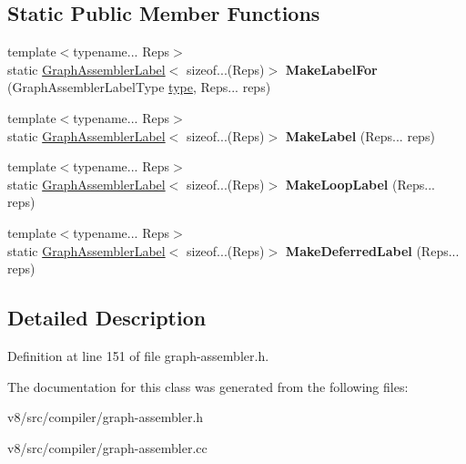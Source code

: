 \subsection*{Static Public Member Functions}
\begin{DoxyCompactItemize}
\item 
\mbox{\label{classv8_1_1internal_1_1compiler_1_1GraphAssembler_ab442635d09c908f12a9c08fe52badd50}} 
{\footnotesize template$<$typename... Reps$>$ }\\static \mbox{\hyperlink{classv8_1_1internal_1_1compiler_1_1GraphAssemblerLabel}{Graph\+Assembler\+Label}}$<$ sizeof...(Reps)$>$ {\bfseries Make\+Label\+For} (Graph\+Assembler\+Label\+Type \mbox{\hyperlink{classstd_1_1conditional_1_1type}{type}}, Reps... reps)
\item 
\mbox{\label{classv8_1_1internal_1_1compiler_1_1GraphAssembler_a90994e28ee9c9d54b7dd725bce4149f7}} 
{\footnotesize template$<$typename... Reps$>$ }\\static \mbox{\hyperlink{classv8_1_1internal_1_1compiler_1_1GraphAssemblerLabel}{Graph\+Assembler\+Label}}$<$ sizeof...(Reps)$>$ {\bfseries Make\+Label} (Reps... reps)
\item 
\mbox{\label{classv8_1_1internal_1_1compiler_1_1GraphAssembler_a4a656fd79b93f6d9d062a9f403be7d3c}} 
{\footnotesize template$<$typename... Reps$>$ }\\static \mbox{\hyperlink{classv8_1_1internal_1_1compiler_1_1GraphAssemblerLabel}{Graph\+Assembler\+Label}}$<$ sizeof...(Reps)$>$ {\bfseries Make\+Loop\+Label} (Reps... reps)
\item 
\mbox{\label{classv8_1_1internal_1_1compiler_1_1GraphAssembler_a9d530b47c70c76203b8bc622a64cac02}} 
{\footnotesize template$<$typename... Reps$>$ }\\static \mbox{\hyperlink{classv8_1_1internal_1_1compiler_1_1GraphAssemblerLabel}{Graph\+Assembler\+Label}}$<$ sizeof...(Reps)$>$ {\bfseries Make\+Deferred\+Label} (Reps... reps)
\end{DoxyCompactItemize}


\subsection{Detailed Description}


Definition at line 151 of file graph-\/assembler.\+h.



The documentation for this class was generated from the following files\+:\begin{DoxyCompactItemize}
\item 
v8/src/compiler/graph-\/assembler.\+h\item 
v8/src/compiler/graph-\/assembler.\+cc\end{DoxyCompactItemize}

